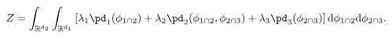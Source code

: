 \begin{equation}
Z = \int_{\mathbb{R}^{d_{2}}}
  \int_{\mathbb{R}^{d_{1}}}
  \left[ 
    \lambda_{1} \pd_{1}(\phi_{1 \cap 2}) + 
    \lambda_{2} \pd_{2}(\phi_{1 \cap 2}, \phi_{2 \cap 3}) + 
    \lambda_{3} \pd_{3}(\phi_{2 \cap 3})
  \right]
  \text{d}\phi_{1 \cap 2}
  \text{d}\phi_{2 \cap 3}.  
  \label{eqn:int-linear-pooling-1} 
\end{equation}